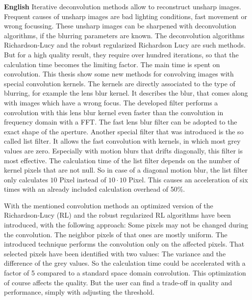 \documentclass[a4paper,12pt]{article}
\begin{document}
\textbf{English}
Iterative deconvolution methods allow to reconstruct unsharp images.
Frequent causes of unsharp images are bad lighting conditions, fast movement or wrong focussing. These unsharp images can be sharpened with deconvolution 
algorithms, if the blurring parameters are known. The deconvolution algorithms 
Richardson-Lucy and the robust regularized Richardson Lucy are such methods. 
But for a high quality result, they require over hundred iterations, 
so that the calculation time becomes the limiting factor. The main time is spent 
on convolution. This thesis show some new methods for convolving images with special 
convolution kernels. The kernels are directly associated to the type of blurring, for 
example the lens blur kernel. It describes the blur, that comes along with images which
 have a wrong focus. The developed filter performs a convolution with this lens blur 
 kernel even faster than the convolution in frequency domain with a FFT. 
The fast lens blur filter can be adopted to the exact shape of the aperture.
Another special filter that was introduced is the so called list filter. 
  It allows the fast convolution with kernels, in which most grey values are zero. 
  Especially with motion blurs that drifts diagonally, this filter is most effective. 
  The calculation time of the list filter depends on the number of kernel pixels 
  that are not null. So in case of a diagonal motion blur, the list filter only 
  calculates $10$ Pixel instead of $10 \cdot 10$ Pixel. This causes an acceleration 
  of six times with an already included calculation overhead of 50\%.

With the mentioned convolution methods an optimized version of the Richardson-Lucy 
(RL) and the robust regularized RL algorithms have been introduced, with the following 
approach: Some pixels may not be changed during the convolution. The neighbor pixels of 
that ones are mostly uniform. The introduced technique performs the convolution only on 
the affected pixels. That selected pixels have been identified with two values: 
The variance and the difference of the grey values. So the calculation time could be 
accelerated with a factor of 5 compared to a standard space domain convolution. This 
optimization of course affects the quality. But the user can find a trade-off in quality 
and performance, simply with adjusting the threshold.






\newpage
\listoffigures 
{} 
\end{document}
